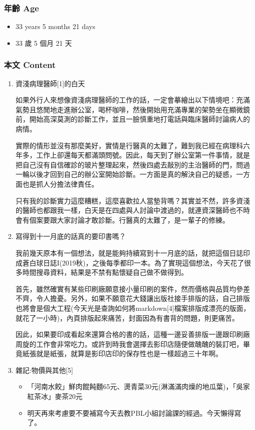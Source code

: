 \documentclass[a5paper, 12pt
]{book}
\providecommand{\tightlist}{%
  \setlength{\itemsep}{0pt}\setlength{\parskip}{0pt}}
\begin{document}
\hypertarget{ux5e74ux9f61-age-13}{%
\subsubsection{年齡 Age}\label{ux5e74ux9f61-age-13}}

\begin{itemize}
\tightlist
\item
  33 years 5 months 21 days
\item
  33 歲 5 個月 21 天
\end{itemize}

\hypertarget{ux672cux6587-content-13}{%
\subsubsection{本文 Content}\label{ux672cux6587-content-13}}

\begin{enumerate}
\def\labelenumi{\arabic{enumi}.}
\item
  資淺病理醫師{[}1{]}的白天

  如果外行人來想像資淺病理醫師的工作的話，一定會摹繪出以下情境吧：充滿氣勢且悠閒地走進辦公室，喝杯咖啡，然後開始用充滿專業的架勢坐在顯微鏡前，開始高深莫測的診斷工作，並且一臉慎重地打電話與臨床醫師討論病人的病情。

  實際的情形並沒有那麼美好，實情是行醫真的太難了，難到我已經在病理科六年多，工作上卻還每天都滿頭問號。因此，每天到了辦公室第一件事情，就是把自己沒有自信確診的玻片整理起來，然後四處去敲別的主治醫師的門，問過一輪以後才回到自己的辦公室開始診斷。一方面是真的解決自己的疑惑，一方面也是抓人分擔法律責任。

  只有我的診斷實力這麼糟糕，這麼喜歡拉人當墊背嗎？其實並不然，許多資淺的醫師也都跟我一樣，白天是在四處與人討論中渡過的，就連資深醫師也不時會有個案要跟大家討論才敢診斷。行醫真的太難了，是一輩子的修練。
\item
  寫得到十一月底的話真的要印書嗎？

  我前幾天原本有一個想法，就是能夠持續寫到十一月底的話，就把這個日誌印成蒼白球日誌I(2019秋)，之後每季都印一本。為了實現這個想法，今天花了很多時間搜尋資料，結果是不禁有點懷疑自己做不做得到。

  首先，雖然確實有某些印刷廠願意接小量印刷的案件，然而價格與品質均參差不齊，令人擔憂。另外，如果不願意花大錢讓出版社接手排版的話，自己排版也將會是個大工程(今天光是查詢如何將markdown{[}4{]}檔案排版成漂亮的版面，就花了一小時)，內頁排版起來痛苦，封面因為有書背的問題，則更痛苦。

  因此，如果要印成看起來還算合格的書的話，這種一邊妥善排版一邊跟印刷廠周旋的工作會非常吃力。或許到時我會選擇去影印店隨便做醜醜的裝訂吧，畢竟紙張就是紙張，就算是影印店印的保存性也是一樣超過三十年啊。
\item
  雜記:物價與其他{[}5{]}

  \begin{itemize}
  \tightlist
  \item
    「河南水餃」鮮肉餛飩麵65元、燙青菜30元(淋滿滿肉燥的地瓜葉)，「吳家紅茶冰」麥茶20元
  \item
    明天再來考慮要不要補寫今天去教PBL小組討論課的經過。今天懶得寫了。
  \end{itemize}
\end{enumerate}
\end{document}
